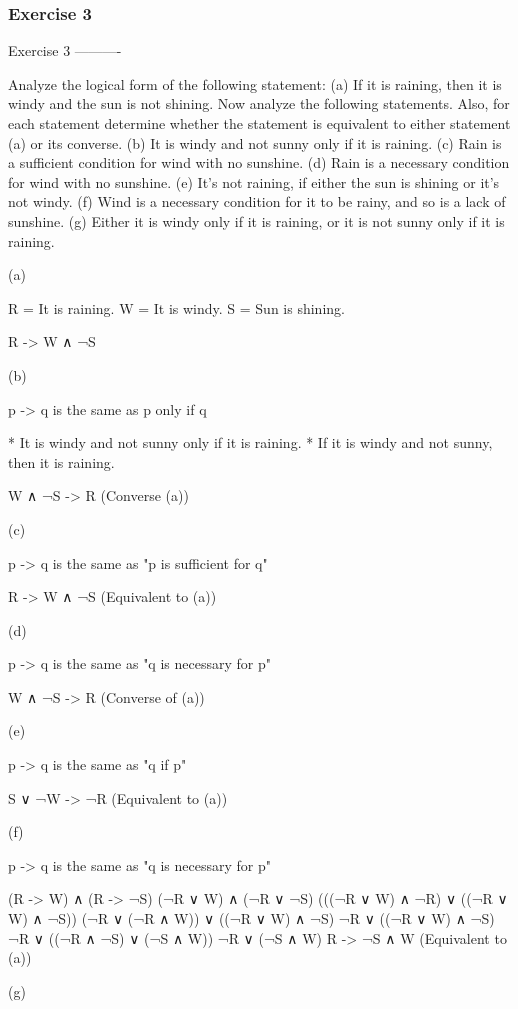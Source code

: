 \subsubsection{Exercise 3}
Exercise 3
----------

    Analyze the logical form of the following statement:
    (a) If it is raining, then it is windy and the sun is not shining.
    Now analyze the following statements. Also, for each statement determine
    whether the statement is equivalent to either statement (a) or its converse.
    (b) It is windy and not sunny only if it is raining.
    (c) Rain is a sufficient condition for wind with no sunshine.
    (d) Rain is a necessary condition for wind with no sunshine.
    (e) It’s not raining, if either the sun is shining or it’s not windy.
    (f) Wind is a necessary condition for it to be rainy, and so is a lack of
    sunshine.
    (g) Either it is windy only if it is raining, or it is not sunny only if it is
    raining.

(a)

R = It is raining.
W = It is windy.
S = Sun is shining.

    R -> W ∧ ¬S

(b)

p -> q is the same as p only if q

* It is windy and not sunny only if it is raining.
* If it is windy and not sunny, then it is raining.

    W ∧ ¬S -> R   (Converse (a))

(c)

p -> q is the same as "p is sufficient for q"

    R -> W ∧ ¬S (Equivalent to (a))

(d)

p -> q is the same as "q is necessary for p"

    W ∧ ¬S -> R (Converse of (a))

(e)

p -> q is the same as "q if p"

    S ∨ ¬W -> ¬R (Equivalent to (a))

(f)

p -> q is the same as "q is necessary for p"

    (R -> W) ∧ (R -> ¬S)
    (¬R ∨ W) ∧ (¬R ∨ ¬S)
    (((¬R ∨ W) ∧ ¬R) ∨ ((¬R ∨ W) ∧ ¬S))
    (¬R ∨ (¬R ∧ W)) ∨ ((¬R ∨ W) ∧ ¬S)
    ¬R ∨ ((¬R ∨ W) ∧ ¬S)
    ¬R ∨ ((¬R ∧ ¬S) ∨ (¬S ∧ W))
    ¬R ∨ (¬S ∧ W)
    R -> ¬S ∧ W (Equivalent to (a))


(g)

